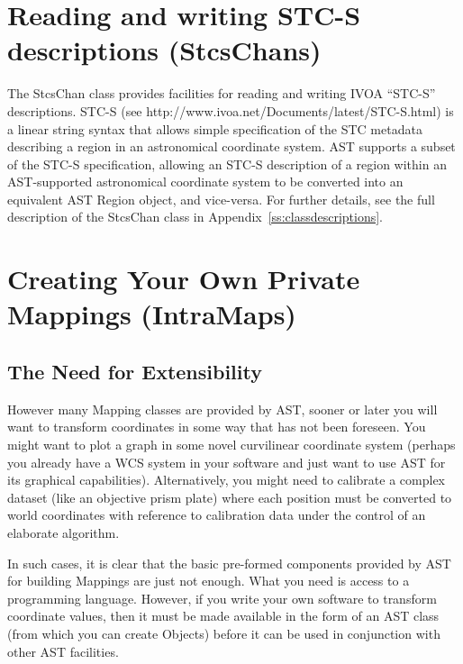 \documentclass[twoside,11pt]{article}
\newcommand{\htmladdnormallink}[2]{#1}
\newcommand{\appref}[1]{Appendix~\ref{#1}}
\newcommand{\appref}[1]{\ref{#1}}
\begin{document}
\cleardoublepage
\section{\label{ss:stcschans}Reading and writing STC-S descriptions (StcsChans)}

The StcsChan class provides facilities for reading and writing
IVOA ``STC-S'' descriptions. STC-S (see \htmladdnormallink{
http://www.ivoa.net/Documents/latest/STC-S.html}{
http://www.ivoa.net/Documents/latest/STC-S.html}) is a linear string
syntax that allows simple specification of the STC metadata describing a
region in an astronomical coordinate system. AST supports a
subset of the STC-S specification, allowing an STC-S description of a
region within an AST-supported astronomical coordinate system to be converted
into an equivalent AST Region object, and vice-versa. For further
details, see the full description of the StcsChan class in
\appref{ss:classdescriptions}.


\cleardoublepage
\section{\label{ss:intramaps}Creating Your Own Private Mappings (IntraMaps)}

\subsection{The Need for Extensibility}

However many Mapping classes are provided by AST, sooner or later you
will want to transform coordinates in some way that has not been
foreseen. You might want to plot a graph in some novel curvilinear
coordinate system (perhaps you already have a WCS system in your
software and just want to use AST for its graphical capabilities).
Alternatively, you might need to calibrate a complex dataset (like an
objective prism plate) where each position must be converted to world
coordinates with reference to calibration data under the control of an
elaborate algorithm.

In such cases, it is clear that the basic pre-formed components
provided by AST for building Mappings are just not enough. What you
need is access to a programming language. However, if you write your
own software to transform coordinate values, then it must be made
available in the form of an AST class (from which you can create
Objects) before it can be used in conjunction with other AST
facilities.
\end{document}
